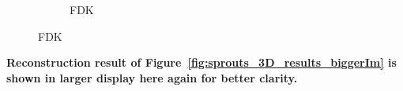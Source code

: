 \documentclass{article}
\begin{document}
\begin{figure}[!h]
    \begin{subfigure}[b]{\linewidth}
\captionsetup{labelformat=empty}
        \caption{\large{FDK}}
     \end{subfigure}
\end{figure}
\newpage
\textbf{Reconstruction result of Figure~\ref{fig:sprouts_3D_results_biggerIm}  is shown in larger display here  again for better clarity.}\\
\end{document}

